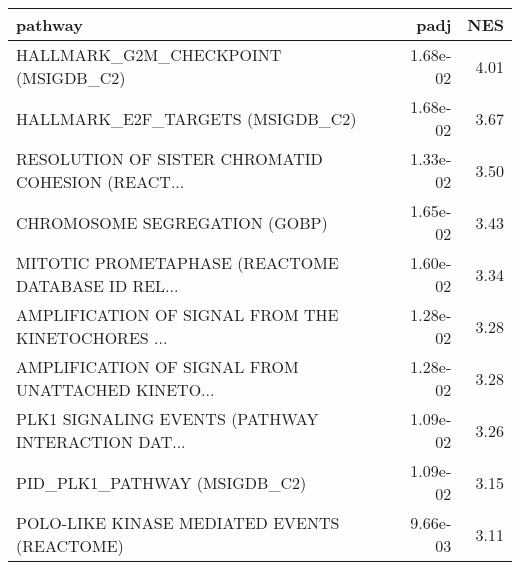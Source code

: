 \begin{tabular}{lrr}
\toprule
                                           pathway &      padj &   NES \\
\midrule
               HALLMARK\_G2M\_CHECKPOINT (MSIGDB\_C2) &  1.68e-02 &  4.01 \\
                  HALLMARK\_E2F\_TARGETS (MSIGDB\_C2) &  1.68e-02 &  3.67 \\
 RESOLUTION OF SISTER CHROMATID COHESION (REACT... &  1.33e-02 &  3.50 \\
                     CHROMOSOME SEGREGATION (GOBP) &  1.65e-02 &  3.43 \\
 MITOTIC PROMETAPHASE (REACTOME DATABASE ID REL... &  1.60e-02 &  3.34 \\
 AMPLIFICATION OF SIGNAL FROM THE KINETOCHORES ... &  1.28e-02 &  3.28 \\
 AMPLIFICATION OF SIGNAL FROM UNATTACHED KINETO... &  1.28e-02 &  3.28 \\
 PLK1 SIGNALING EVENTS (PATHWAY INTERACTION DAT... &  1.09e-02 &  3.26 \\
                      PID\_PLK1\_PATHWAY (MSIGDB\_C2) &  1.09e-02 &  3.15 \\
       POLO-LIKE KINASE MEDIATED EVENTS (REACTOME) &  9.66e-03 &  3.11 \\
\bottomrule
\end{tabular}
